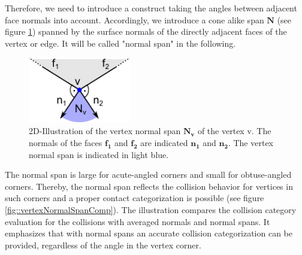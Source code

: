 Therefore, we need to introduce a construct taking the angles between adjacent face normals into account.
 Accordingly, we introduce a cone alike span $\mathbf{N}$ (see figure \ref{fig::vertexNormalSpan}) spanned by the surface normals of the directly adjacent faces of the vertex or edge. It will be called "normal span" in the following. 
\begin{figure}[h] 
  \centering
     \includegraphics[width=0.4\textwidth]{pics/pdf/vertexNormalSpan.pdf}
  \caption[2D-Illustration of the vertex normal span $\mathbf{N_v}$ of the vertex v.]{2D-Illustration of the vertex normal span $\mathbf{N_v}$ of the vertex v. The normals of the faces $\mathbf{f_1}$ and $\mathbf{f_2}$ are indicated $\mathbf{n_1}$ and $\mathbf{n_2}$. The vertex normal span is indicated in light blue.}
  \label{fig::vertexNormalSpan}
\end{figure}
The normal span is large for acute-angled corners and small for obtuse-angled corners. Thereby, the normal span reflects the collision behavior for vertices in such corners and a proper contact categorization is possible (see figure 
\ref{fig::vertexNormalSpanComp}). The illustration compares the collision category evaluation for the collisions with averaged normals and normal spans. It emphasizes that with normal spans an accurate collision categorization can be provided, regardless of the angle in the vertex corner.
